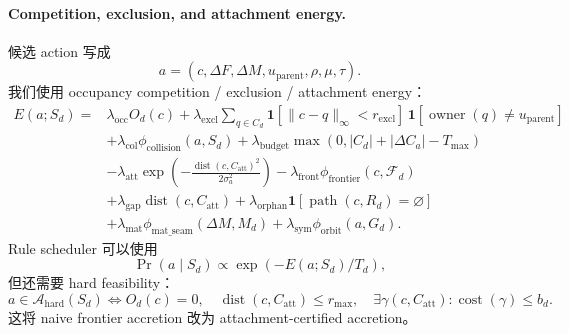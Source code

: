 \paragraph{Competition, exclusion, and attachment energy.}
候选 action 写成
\begin{equation}
a=(c,\Delta F,\Delta M,u_{\mathrm{parent}},\rho,\mu,\tau).
\end{equation}
我们使用 occupancy competition / exclusion / attachment energy：
\begin{equation}
\begin{split}
E(a;S_d)=&
\lambda_{\mathrm{occ}}O_d(c)
+\lambda_{\mathrm{excl}}\sum_{q\in C_d}
\mathbf 1[\|c-q\|_\infty<r_{\mathrm{excl}}]\,
\mathbf 1[\operatorname{owner}(q)\ne u_{\mathrm{parent}}]\\
&+\lambda_{\mathrm{col}}\phi_{\mathrm{collision}}(a,S_d)
+\lambda_{\mathrm{budget}}\max(0,|C_d|+|\Delta C_a|-T_{\max})\\
&-\lambda_{\mathrm{att}}\exp\left(
-\frac{\operatorname{dist}(c,C_{\mathrm{att}})^2}{2\sigma_a^2}\right)
-\lambda_{\mathrm{front}}\phi_{\mathrm{frontier}}(c,\mathcal F_d)\\
&+\lambda_{\mathrm{gap}}\operatorname{dist}(c,C_{\mathrm{att}})
+\lambda_{\mathrm{orphan}}\mathbf 1[\operatorname{path}(c,R_d)=\varnothing]\\
&+\lambda_{\mathrm{mat}}\phi_{\mathrm{mat\_seam}}(\Delta M,M_d)
+\lambda_{\mathrm{sym}}\phi_{\mathrm{orbit}}(a,G_d).
\end{split}
\end{equation}
Rule scheduler 可以使用
\begin{equation}
\Pr(a\mid S_d)\propto \exp(-E(a;S_d)/T_d),
\end{equation}
但还需要 hard feasibility：
\begin{equation}
a\in\mathcal A_{\mathrm{hard}}(S_d)
\Longleftrightarrow
O_d(c)=0,\quad
\operatorname{dist}(c,C_{\mathrm{att}})\le r_{\max},\quad
\exists\gamma(c,C_{\mathrm{att}}):\operatorname{cost}(\gamma)\le b_d .
\end{equation}
这将 naive frontier accretion 改为 attachment-certified accretion。

